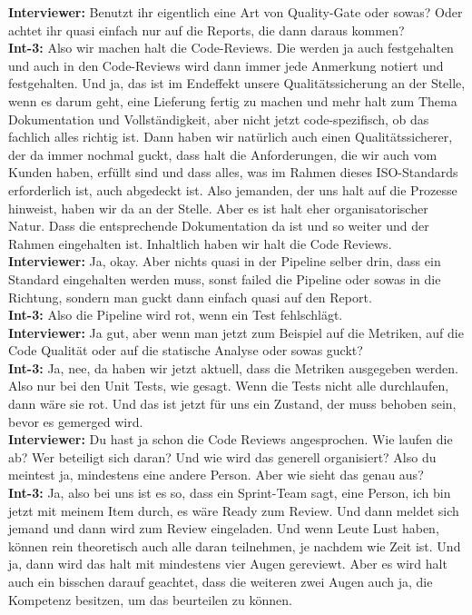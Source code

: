 \textbf{Interviewer:} Benutzt ihr eigentlich eine Art von Quality-Gate oder sowas? Oder achtet ihr quasi einfach nur auf die Reports, die dann daraus kommen? \\
\textbf{Int-3:} Also wir machen halt die Code-Reviews. Die werden ja auch festgehalten und auch in den Code-Reviews wird dann immer jede Anmerkung notiert und festgehalten. Und ja, das ist im Endeffekt unsere Qualitätssicherung an der Stelle, wenn es darum geht, eine Lieferung fertig zu machen und mehr halt zum Thema Dokumentation und Vollständigkeit, aber nicht jetzt code-spezifisch, ob das fachlich alles richtig ist. Dann haben wir natürlich auch einen Qualitätssicherer, der da immer nochmal guckt, dass halt die Anforderungen, die wir auch vom Kunden haben, erfüllt sind und dass alles, was im Rahmen dieses ISO-Standards erforderlich ist, auch abgedeckt ist. Also jemanden, der uns halt auf die Prozesse hinweist, haben wir da an der Stelle. Aber es ist halt eher organisatorischer Natur. Dass die entsprechende Dokumentation da ist und so weiter und der Rahmen eingehalten ist. Inhaltlich haben wir halt die Code Reviews. \\
\textbf{Interviewer:} Ja, okay. Aber nichts quasi in der Pipeline selber drin, dass ein Standard eingehalten werden muss, sonst failed die Pipeline oder sowas in die Richtung, sondern man guckt dann einfach quasi auf den Report. \\
\textbf{Int-3:} Also die Pipeline wird rot, wenn ein Test fehlschlägt. \\
\textbf{Interviewer:} Ja gut, aber wenn man jetzt zum Beispiel auf die Metriken, auf die Code Qualität oder auf die statische Analyse oder sowas guckt?\\
\textbf{Int-3:} Ja, nee, da haben wir jetzt aktuell, dass die Metriken ausgegeben werden. Also nur bei den Unit Tests, wie gesagt. Wenn die Tests nicht alle durchlaufen, dann wäre sie rot. Und das ist jetzt für uns ein Zustand, der muss behoben sein, bevor es gemerged wird. \\
\textbf{Interviewer:} Du hast ja schon die Code Reviews angesprochen. Wie laufen die ab? Wer beteiligt sich daran? Und wie wird das generell organisiert? Also du meintest ja, mindestens eine andere Person. Aber wie sieht das genau aus? \\
\textbf{Int-3:} Ja, also bei uns ist es so, dass ein Sprint-Team sagt, eine Person, ich bin jetzt mit meinem Item durch, es wäre Ready zum Review. Und dann meldet sich jemand und dann wird zum Review eingeladen. Und wenn Leute Lust haben, können rein theoretisch auch alle daran teilnehmen, je nachdem wie Zeit ist. Und ja, dann wird das halt mit mindestens vier Augen gereviewt. Aber es wird halt auch ein bisschen darauf geachtet, dass die weiteren zwei Augen auch ja, die Kompetenz besitzen, um das beurteilen zu können. \\
